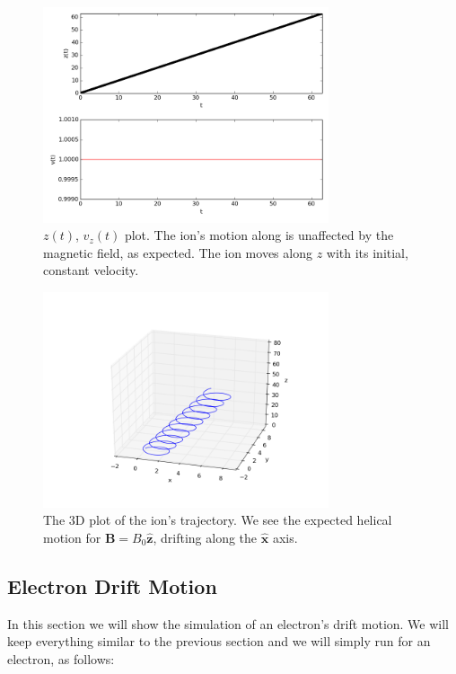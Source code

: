 \documentclass[11pt]{report}
\begin{document}
\begin{figure}[!ht]
  \centering
    \includegraphics[width=0.75\textwidth]{images/drift_ion_z}
     \caption{$z(t)$, $v_z(t)$ plot. The ion's motion along  is unaffected by the magnetic field, as expected. The ion moves along $z$ with its initial, constant velocity.}
\end{figure}

\begin{figure}[!ht]
  \centering
    \includegraphics[width=0.75\textwidth]{images/drift_ion_3d}
     \caption{The 3D plot of the ion's trajectory. We see the expected helical motion for $\bm{B} = B_0 \hat{\bm{z}}$, drifting along the $\hat{\bm{x}}$ axis.}
\end{figure}

\newpage

\subsection{Electron Drift Motion}
In this section we will show the simulation of an electron's drift motion. We will keep everything similar to the previous section and we will simply run for an electron, as follows:
\end{document}
